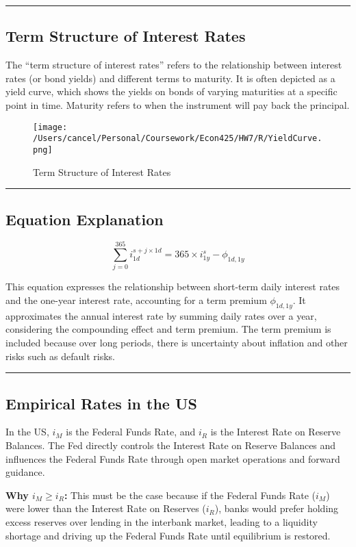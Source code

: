 \documentclass{article}
\begin{document}
\noindent\rule{\linewidth}{0.5pt}

\subsection{Term Structure of Interest Rates}
The ``term structure of interest rates'' refers to the relationship between interest rates (or bond yields) and different terms to maturity. It is often depicted as a yield curve, which shows the yields on bonds of varying maturities at a specific point in time. Maturity refers to when the instrument will pay back the principal.
\begin{figure}[ht!]
    \centering
    \texttt{[image: /Users/cancel/Personal/Coursework/Econ425/HW7/R/YieldCurve.png]}
    \caption{Term Structure of Interest Rates}
\label{fig:yieldcurve}
\end{figure}

\noindent\rule{\linewidth}{0.5pt}

\subsection{Equation Explanation}
\[ \sum_{j=0}^{365} i_{1d}^{s+j \times 1d} = 365 \times i_{1y}^{s} - \phi_{1d,1y} \]

This equation expresses the relationship between short-term daily interest rates and the one-year interest rate, accounting for a term premium \(\phi_{1d,1y}\). It approximates the annual interest rate by summing daily rates over a year, considering the compounding effect and term premium. The term premium is included because over long periods, there is uncertainty about inflation and other risks such as default risks.

\noindent\rule{\linewidth}{0.5pt}

\subsection{Empirical Rates in the US}
In the US, \(i_M\) is the Federal Funds Rate, and \(i_R\) is the Interest Rate on Reserve Balances. The Fed directly controls the Interest Rate on Reserve Balances and influences the Federal Funds Rate through open market operations and forward guidance.

\textbf{Why \(i_M \geq i_R\):} This must be the case because if the Federal Funds Rate (\(i_M\)) were lower than the Interest Rate on Reserves (\(i_R\)), banks would prefer holding excess reserves over lending in the interbank market, leading to a liquidity shortage and driving up the Federal Funds Rate until equilibrium is restored.
\end{document}
